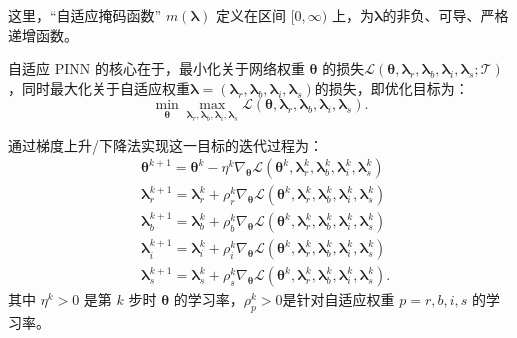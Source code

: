 这里，“自适应掩码函数” $m(\boldsymbol{\lambda})$ 定义在区间 $[0,\infty)$ 上，为$\boldsymbol{\lambda}$的非负、可导、严格递增函数。

自适应 PINN 的核心在于，最小化关于网络权重 $\boldsymbol{\theta}$ 的损失$\mathcal{L}(\boldsymbol{\theta},\boldsymbol{\lambda}_r,\boldsymbol{\lambda}_b,\boldsymbol{\lambda}_i,\boldsymbol{\lambda}_s;\mathcal{T}) $，同时最大化关于自适应权重$\boldsymbol{\lambda}=(\boldsymbol{\lambda}_r,\boldsymbol{\lambda}_b,\boldsymbol{\lambda}_i,\boldsymbol{\lambda}_s)$的损失，即优化目标为：
\begin{equation}\min_{\boldsymbol{\theta}}\max_{\boldsymbol{\lambda}_r,\boldsymbol{\lambda}_b,\boldsymbol{\lambda}_i,\boldsymbol{\lambda}_s}\mathcal{L}(\boldsymbol{\theta},\boldsymbol{\lambda}_r,\boldsymbol{\lambda}_b,\boldsymbol{\lambda}_i,\boldsymbol{\lambda}_s) .\end{equation}

通过梯度上升/下降法实现这一目标的迭代过程为：
\begin{equation}
    \begin{aligned}
        &\boldsymbol{\theta}^{k+1} = \boldsymbol{\theta}^k - \eta^k \nabla_{\boldsymbol{\theta}}\mathcal{L}(\boldsymbol{\theta}^k,\boldsymbol{\lambda}_r^k,\boldsymbol{\lambda}_b^k,\boldsymbol{\lambda}_i^k,\boldsymbol{\lambda}_s^k) \\
        &\boldsymbol{\lambda}_r^{k+1} = \boldsymbol{\lambda}_r^k + \rho_r^k \nabla_{\boldsymbol{\theta}}\mathcal{L}(\boldsymbol{\theta}^k,\boldsymbol{\lambda}_r^k,\boldsymbol{\lambda}_b^k,\boldsymbol{\lambda}_i^k,\boldsymbol{\lambda}_s^k) \\
        &\boldsymbol{\lambda}_b^{k+1} = \boldsymbol{\lambda}_b^k + \rho_b^k \nabla_{\boldsymbol{\theta}}\mathcal{L}(\boldsymbol{\theta}^k,\boldsymbol{\lambda}_r^k,\boldsymbol{\lambda}_b^k,\boldsymbol{\lambda}_i^k,\boldsymbol{\lambda}_s^k) \\
        &\boldsymbol{\lambda}_i^{k+1} = \boldsymbol{\lambda}_i^k + \rho_i^k \nabla_{\boldsymbol{\theta}}\mathcal{L}(\boldsymbol{\theta}^k,\boldsymbol{\lambda}_r^k,\boldsymbol{\lambda}_b^k,\boldsymbol{\lambda}_i^k,\boldsymbol{\lambda}_s^k) \\
        &\boldsymbol{\lambda}_s^{k+1} = \boldsymbol{\lambda}_s^k + \rho_s^k \nabla_{\boldsymbol{\theta}}\mathcal{L}(\boldsymbol{\theta}^k,\boldsymbol{\lambda}_r^k,\boldsymbol{\lambda}_b^k,\boldsymbol{\lambda}_i^k,\boldsymbol{\lambda}_s^k) . 
    \end{aligned}
\end{equation}
其中 $\eta^k > 0$ 是第 $k$ 步时 $\boldsymbol{\theta}$ 的学习率，$\rho_p^k > 0$是针对自适应权重 $p=r,b,i,s$ 的学习率。
 
